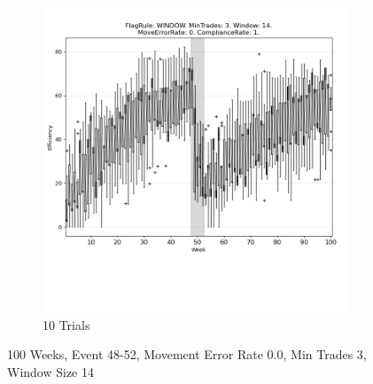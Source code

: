 \documentclass{article}%
\begin{document}
\begin{figure}[!htb]
\begin{subfigure}[b]{0.45\linewidth}
\includegraphics[clip,width=\linewidth,trim=0 4cm 0 0]{0056fr_WINDOW_mt_3_ws_14_er_0_cr_1_t10.png}%
\caption{10 Trials}%
\end{subfigure}%
\caption{100 Weeks, Event 48{-}52, Movement Error Rate 0.0, Min Trades 3, Window Size 14}%
\end{figure}

%
\end{document}

